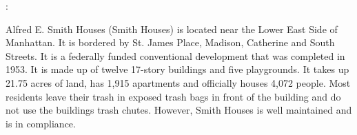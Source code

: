 :

Alfred E. Smith Houses (Smith Houses) is located near the Lower East Side of Manhattan. It is bordered by St. James Place, Madison, Catherine and South Streets. It is a federally funded conventional development that was completed in 1953. It is made up of twelve 17-story buildings and five playgrounds. It takes up 21.75 acres of land,  has 1,915 apartments and officially houses 4,072 people. Most residents leave their trash in exposed trash bags in front of the building and do not use the buildings trash chutes. However, Smith Houses is well maintained and is in compliance.